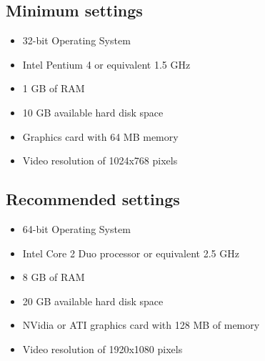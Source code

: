 \subsection{Minimum settings}

\begin{itemize}
	\item 32-bit Operating System
	\item Intel Pentium 4 or equivalent 1.5 GHz
	\item 1 GB of RAM
	\item 10 GB available hard disk space
	\item Graphics card with 64 MB memory
	\item Video resolution of 1024x768 pixels
\end{itemize}


\subsection{Recommended settings}
\begin{itemize}
	\item 64-bit Operating System
	\item Intel Core 2 Duo processor or equivalent 2.5 GHz
	\item 8 GB of RAM
	\item 20 GB available hard disk space
	\item NVidia or ATI graphics card with 128 MB of memory
	\item Video resolution of 1920x1080 pixels
\end{itemize}


